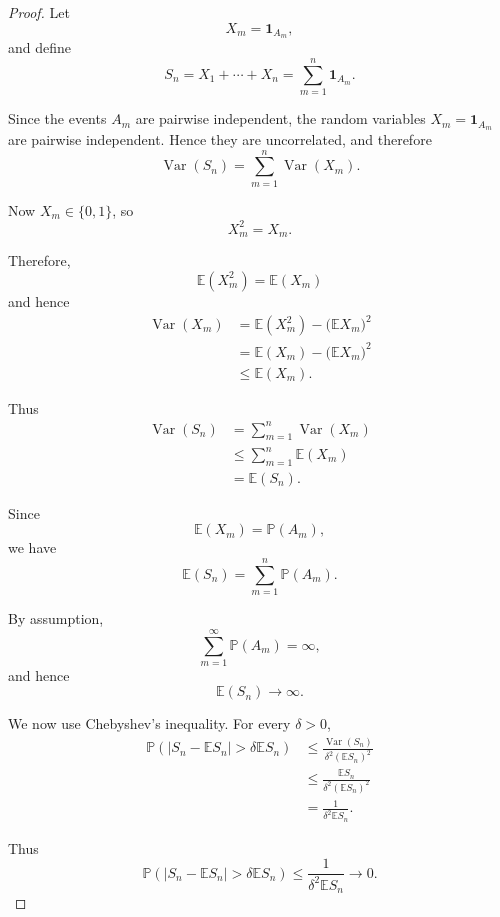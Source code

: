 \begin{proof}

Let
\[
    X_m=\mathbf{1}_{A_m},
\]
and define
\[
    S_n=X_1+\cdots+X_n
    =
    \sum_{m=1}^{n}\mathbf{1}_{A_m}.
\]

Since the events $A_m$ are pairwise independent, the random variables
$X_m=\mathbf{1}_{A_m}$ are pairwise independent. Hence they are
uncorrelated, and therefore
\[
    \operatorname{Var}(S_n)
    =
    \sum_{m=1}^{n}\operatorname{Var}(X_m).
\]

Now $X_m\in\{0,1\}$, so
\[
    X_m^2=X_m.
\]

Therefore,
\[
    \mathbb E(X_m^2)=\mathbb E(X_m)
\]
and hence
\[
\begin{aligned}
    \operatorname{Var}(X_m)
    &=
    \mathbb E(X_m^2)
    -
    \bigl(\mathbb E X_m\bigr)^2
    \\
    &=
    \mathbb E(X_m)
    -
    \bigl(\mathbb E X_m\bigr)^2
    \\
    &\leq
    \mathbb E(X_m).
\end{aligned}
\]

Thus
\[
\begin{aligned}
    \operatorname{Var}(S_n)
    &=
    \sum_{m=1}^{n}\operatorname{Var}(X_m)
    \\
    &\leq
    \sum_{m=1}^{n}\mathbb E(X_m)
    \\
    &=
    \mathbb E(S_n).
\end{aligned}
\]

Since
\[
    \mathbb E(X_m)
    =
    \mathbb P(A_m),
\]
we have
\[
    \boxed{
    \mathbb E(S_n)
    =
    \sum_{m=1}^{n}\mathbb P(A_m).
    }
\]

By assumption,
\[
    \sum_{m=1}^{\infty}\mathbb P(A_m)=\infty,
\]
and hence
\[
    \mathbb E(S_n)\longrightarrow\infty.
\]

We now use Chebyshev's inequality. For every $\delta>0$,
\[
\begin{aligned}
    \mathbb P\left(
        |S_n-\mathbb E S_n|
        >
        \delta\mathbb E S_n
    \right)
    &\leq
    \frac{\operatorname{Var}(S_n)}
         {\delta^2(\mathbb E S_n)^2}
    \\
    &\leq
    \frac{\mathbb E S_n}
         {\delta^2(\mathbb E S_n)^2}
    \\
    &=
    \frac{1}
         {\delta^2\mathbb E S_n}.
\end{aligned}
\]

Thus
\[
    \boxed{
    \mathbb P\left(
        |S_n-\mathbb E S_n|
        >
        \delta\mathbb E S_n
    \right)
    \leq
    \frac{1}{\delta^2\mathbb E S_n}
    \longrightarrow0.
    }
\]


\end{proof}

